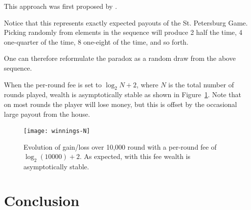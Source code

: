 \documentclass{article}
\begin{document}
This approach was first proposed by \textcite{Steinhaus1949}.
  

Notice that this represents exactly expected payouts of the St. Petersburg Game. Picking randomly from elements in the sequence will produce 2 half the time, 4 one-quarter of the time, 8 one-eight of the time, and so forth.

One can therefore reformulate the paradox as a random draw from the above sequence.

When the per-round fee is set to $\log_2N+2$, where $N$ is the total number of rounds played, wealth is asymptotically stable as shown in Figure~\ref{fig:evolution-fair}. Note that on most rounds the player will lose money, but this is offset by the occasional large payout from the house.

\begin{figure}[htb]
  \centering
  \texttt{[image: winnings-N]}
  \caption{Evolution of gain/loss over 10,000 round with a per-round fee of $\log_2(10000)+2$. As expected, with this fee wealth is asymptotically stable.}
  \label{fig:evolution-fair}
\end{figure}

\section{Conclusion}

\clearpage
\printbibliography
\end{document}
